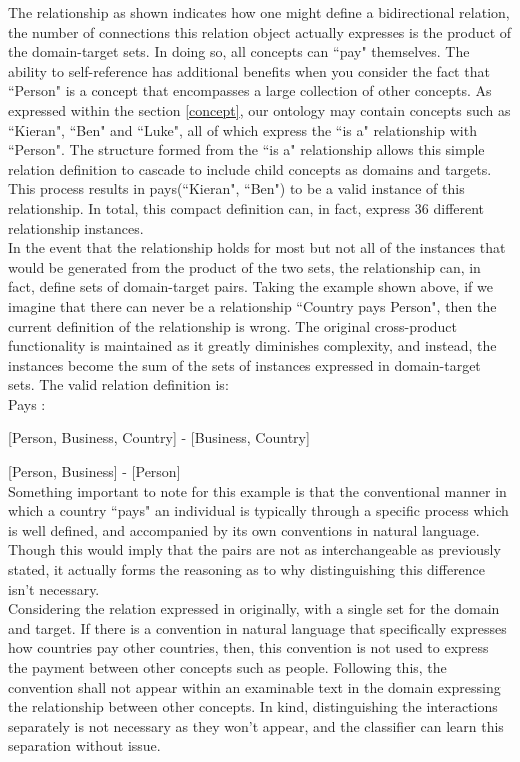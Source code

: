 \documentclass[12pt]{article} %
\begin{document}
The relationship as shown indicates how one might define a bidirectional relation, the number of connections this relation object actually expresses is the product of the domain-target sets. In doing so, all concepts can ``pay" themselves. The ability to self-reference has additional benefits when you consider the fact that ``Person" is a concept that encompasses a large collection of other concepts. As expressed within the section \ref{concept}, our ontology may contain concepts such as ``Kieran", ``Ben" and ``Luke", all of which express the ``is a" relationship with ``Person". The structure formed from the ``is a" relationship allows this simple relation definition to cascade to include child concepts as domains and targets. This process results in pays(``Kieran", ``Ben") to be a valid instance of this relationship. In total, this compact definition can, in fact, express 36 different relationship instances.\\

In the event that the relationship holds for most but not all of the instances that would be generated from the product of the two sets, the relationship can, in fact, define sets of domain-target pairs. Taking the example shown above, if we imagine that there can never be a relationship ``Country pays Person", then the current definition of the relationship is wrong. The original cross-product functionality is maintained as it greatly diminishes complexity, and instead, the instances become the sum of the sets of instances expressed in domain-target sets. The valid relation definition is:\\

\noindent Pays :

[Person, Business, Country] - [Business, Country]

[Person, Business] - [Person]\\

Something important to note for this example is that the conventional manner in which a country ``pays" an individual is typically through a specific process which is well defined, and accompanied by its own conventions in natural language. Though this would imply that the pairs are not as interchangeable as previously stated, it actually forms the reasoning as to why distinguishing this difference isn’t necessary.\\

Considering the relation expressed in originally, with a single set for the domain and target. If there is a convention in natural language that specifically expresses how countries pay other countries, then, this convention is not used to express the payment between other concepts such as people. Following this, the convention shall not appear within an examinable text in the domain expressing the relationship between other concepts. In kind, distinguishing the interactions separately is not necessary as they won’t appear, and the classifier can learn this separation without issue.\\
\end{document}
